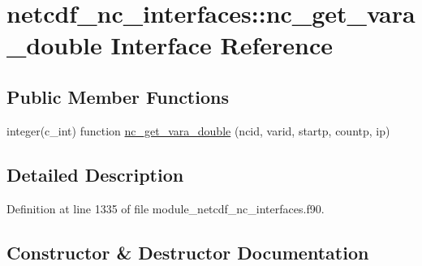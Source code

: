 \hypertarget{interfacenetcdf__nc__interfaces_1_1nc__get__vara__double}{}\section{netcdf\+\_\+nc\+\_\+interfaces\+:\+:nc\+\_\+get\+\_\+vara\+\_\+double Interface Reference}
\label{interfacenetcdf__nc__interfaces_1_1nc__get__vara__double}
\subsection*{Public Member Functions}
\begin{DoxyCompactItemize}
\item 
integer(c\+\_\+int) function \hyperlink{interfacenetcdf__nc__interfaces_1_1nc__get__vara__double_aabf77a4765ea9642b9d0eb4c0d49fcb5}{nc\+\_\+get\+\_\+vara\+\_\+double} (ncid, varid, startp, countp, ip)
\end{DoxyCompactItemize}


\subsection{Detailed Description}


Definition at line 1335 of file module\+\_\+netcdf\+\_\+nc\+\_\+interfaces.\+f90.



\subsection{Constructor \& Destructor Documentation}
\mbox{\label{interfacenetcdf__nc__interfaces_1_1nc__get__vara__double_aabf77a4765ea9642b9d0eb4c0d49fcb5}} 
